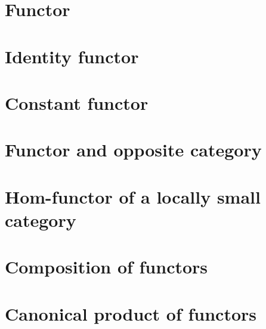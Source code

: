 \section{Functor}
    
\section{Identity functor}
    
\section{Constant functor}
    
\section{Functor and opposite category}
    
\section{Hom-functor of a locally small category}
    
\section{Composition of functors}
    
\section{Canonical product of functors}
    
